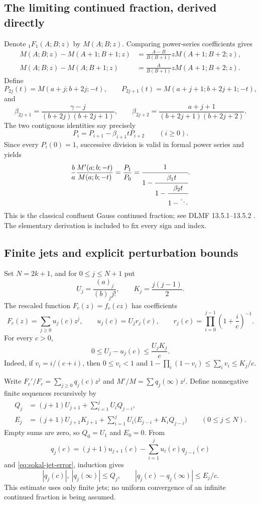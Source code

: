 \documentclass[11pt,a4paper]{article}
\theoremstyle{remark}
\begin{document}
\subsection{The limiting continued fraction, derived directly}
Denote ${}_1F_1(A;B;z)$ by $M(A;B;z)$. Comparing power-series coefficients
gives
\begin{align}
 M(A;B;z)-M(A+1;B+1;z)
 &=\frac{A-B}{B(B+1)}zM(A+1;B+2;z),\label{eq:sokal-contig-one}\\
 M(A;B;z)-M(A;B+1;z)
 &=\frac{A}{B(B+1)}zM(A+1;B+2;z).\label{eq:sokal-contig-two}
\end{align}
Define
\[
 P_{2j}(t)=M(a+j;b+2j;-t),\qquad
 P_{2j+1}(t)=M(a+j+1;b+2j+1;-t),
\]
and
\[
 \beta_{2j+1}=\frac{\gamma-j}{(b+2j)(b+2j+1)},\qquad
 \beta_{2j+2}=\frac{a+j+1}{(b+2j+1)(b+2j+2)}.
\]
The two contiguous identities say precisely
\[
 P_i=P_{i+1}-\beta_{i+1}tP_{i+2}\qquad(i\ge0).
\]
Since every $P_i(0)=1$, successive division is valid in formal power
series and yields
\[
 \frac{b}{a}\frac{M'(a;b;-t)}{M(a;b;-t)}
 =\frac{P_1}{P_0}
 =\cfrac{1}{1-\cfrac{\beta_1t}{1-\cfrac{\beta_2t}{1-\ddots}}}.
\]
This is the classical confluent Gauss continued fraction; see
DLMF 13.5.1--13.5.2 \cite{dlmf}. The elementary
derivation is included to fix every sign and index.

\subsection{Finite jets and explicit perturbation bounds}
Set $N=2k+1$, and for $0\le j\le N+1$ put
\[
 U_j=\frac{(a)_j}{(b)_j j!},\qquad K_j=\frac{j(j-1)}2.
\]
The rescaled function $F_c(z)=f_c(cz)$ has coefficients
\[
 F_c(z)=\sum_{j\ge0}u_j(c)z^j,\qquad
 u_j(c)=U_jr_j(c),\qquad
 r_j(c)=\prod_{i=0}^{j-1}\left(1+\frac{i}{c}\right)^{-1}.
\]
For every $c>0$,
\begin{equation}\label{eq:sokal-jet-error}
 0\le U_j-u_j(c)\le\frac{U_jK_j}{c}.
\end{equation}
Indeed, if $v_i=i/(c+i)$, then $0\le v_i<1$ and
$1-\prod_i(1-v_i)\le\sum_i v_i\le K_j/c$.

Write $F_c'/F_c=\sum_{j\ge0}q_j(c)z^j$ and $M'/M=\sum q_j(\infty)z^j$.
Define nonnegative finite sequences recursively by
\begin{align*}
 Q_j&=(j+1)U_{j+1}+\sum_{i=1}^{j}U_iQ_{j-i},\\
 E_j&=(j+1)U_{j+1}K_{j+1}
       +\sum_{i=1}^{j}U_i\bigl(E_{j-i}+K_iQ_{j-i}\bigr)
       \qquad(0\le j\le N).
\end{align*}
Empty sums are zero, so $Q_0=U_1$ and $E_0=0$.
From
\[
 q_j(c)=(j+1)u_{j+1}(c)-\sum_{i=1}^{j}u_i(c)q_{j-i}(c)
\]
and \eqref{eq:sokal-jet-error}, induction gives
\begin{equation}\label{eq:sokal-log-jet-error}
 |q_j(c)|,\ |q_j(\infty)|\le Q_j,\qquad
 |q_j(c)-q_j(\infty)|\le E_j/c.
\end{equation}
This estimate uses only finite jets; no uniform convergence of an infinite
continued fraction is being assumed.
\end{document}
